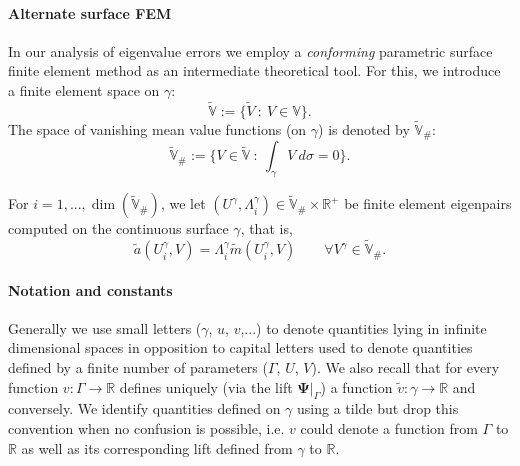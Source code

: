 \documentclass{siamart0516}
\newcommand{\bPsi}{\ensuremath{\boldsymbol \Psi}}
\numberwithin{equation}{section}
\numberwithin{theorem}{section}
\numberwithin{figure}{section}
\begin{document}
\paragraph{Alternate surface FEM}  In our analysis of eigenvalue errors we employ a {\it conforming} parametric surface finite element method as an intermediate theoretical tool.  For this, we introduce a finite element space on $\gamma$: 
\begin{equation*}
\widetilde {\mathbb V}:= \{ \tilde V  \ : \ V \in \mathbb V \}.
\end{equation*}
The space of vanishing mean value functions (on $\gamma$) is denoted by  $\widetilde{\mathbb V}_\#$:
\begin{equation*}
\widetilde{\mathbb V}_\#:= \{V \in \widetilde{\mathbb V} \ : \ \int_\gamma V ~ d\sigma = 0\}.
\end{equation*}

 For $i=1,...,\dim(\widetilde{\mathbb V}_\#)$, we let $(U^\gamma, \Lambda^{\gamma}_i) \in \widetilde{\mathbb V}_\#\times \mathbb{R}^+$ be finite element eigenpairs computed on the continuous surface $\gamma$, that is, 
\begin{equation}\label{e:eigenproblem_discrete_gamma}
\tilde a(U^\gamma_i, V) = \Lambda_{i}^\gamma \tilde m(U^\gamma_i, V) \qquad \forall V^\gamma \in \widetilde{\mathbb V}_\#.
\end{equation}




\paragraph{Notation and constants} Generally we use small letters ($\gamma$, $u$, $v$,...) to denote quantities lying in infinite dimensional spaces in opposition to capital letters used to denote quantities defined by a finite number of parameters ($\Gamma$, $U$, $V$).  
We also recall that for every function $v:\Gamma \rightarrow \mathbb R$ defines uniquely (via the lift  $\bPsi|_\Gamma$) a function $\tilde v:\gamma \rightarrow \mathbb R$ and conversely. We identify quantities defined on $\gamma$ using a tilde but drop this convention when no confusion is possible, i.e. $v$ could denote a function from $\Gamma$ to $\mathbb R$ as well as its corresponding lift defined from $\gamma$ to $\mathbb R$.
\end{document}
